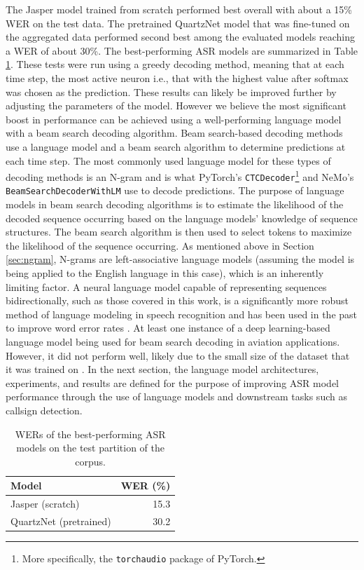 \documentclass[12pt]{article}
\begin{document}
The Jasper model trained from scratch performed best overall with about a 15\% WER on the test data. The pretrained QuartzNet model that was
fine-tuned on the aggregated data performed second best among the evaluated models reaching a WER of about 30\%. The best-performing ASR models are
summarized in Table \ref{tab:asr_performance}. These tests were run using a greedy decoding method, meaning that at each time step, the most active
neuron i.e., that with the highest value after softmax was chosen as the prediction. These results can likely be improved further by adjusting the
parameters of the model. However we believe the most significant boost in performance can be achieved using a well-performing language model with a
beam search decoding algorithm. Beam search-based decoding methods use a language model and a beam search algorithm to determine predictions at each
time step. The most commonly used language model for these types of decoding methods is an N-gram and is what PyTorch's
\lstinline|CTCDecoder|\footnote{More specifically, the \lstinline|torchaudio| package of PyTorch.} \cite{paszke_pytorch_2019} and NeMo's
\lstinline|BeamSearchDecoderWithLM| \cite{kuchaiev_nemo_2019} use to decode predictions. The purpose of language models in beam search decoding
algorithms is to estimate the likelihood of the decoded sequence occurring based on the language models' knowledge of sequence structures. The beam
search algorithm is then used to select tokens to maximize the likelihood of the
sequence occurring. As mentioned above in Section \ref{sec:ngram}, N-grams are left-associative language models (assuming the model is being
applied to the English language in this case), which is an inherently limiting factor. A neural language model capable of representing sequences
bidirectionally, such as those covered in this work, is a significantly more robust method of language modeling in speech recognition and has been
used in the past to improve word error rates \cite{kriman_quartznet_2020,majumdar_citrinet_2021}. At least one instance of a deep learning-based
language model being used for beam search decoding in aviation applications. However, it did not perform well, likely due to the small size of the
dataset that it was trained on \cite{pellegrini_airbus_2019}. In the next section, the language model architectures, experiments, and results are defined
for the purpose of improving ASR model performance through the use of language models and downstream tasks such as callsign detection.

\begin{table}[!t]
    \centering
    \begin{tabular}{l r}
        \toprule
        Model                  & WER (\%) \\
        \midrule
        Jasper (scratch)       & 15.3     \\
        QuartzNet (pretrained) & 30.2     \\
        \bottomrule
    \end{tabular}
    \caption{WERs of the best-performing ASR models on the test partition of the corpus.}
    \label{tab:asr_performance}
\end{table}
\end{document}
